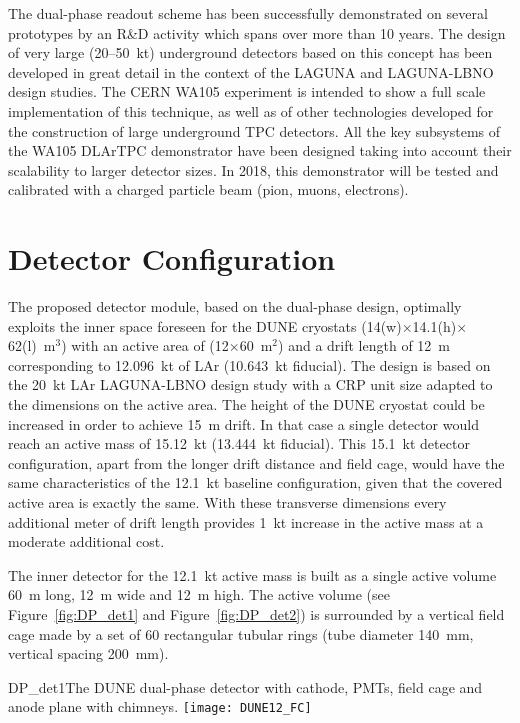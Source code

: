 The dual-phase readout scheme has been successfully demonstrated on
several prototypes by an R\&D activity which spans over more than 10
years.  The design of very large (20--50~kt) underground detectors
based on this concept has been developed in great detail in the
context of the LAGUNA and LAGUNA-LBNO design studies.  The CERN WA105
experiment is intended to show a full scale implementation of this
technique, as well as of other technologies developed for the
construction of large underground TPC detectors.  All the key
subsystems of the WA105 DLArTPC demonstrator have been designed
taking into account their scalability to larger detector sizes.  In
2018, this demonstrator will be tested and calibrated with a charged
particle beam (pion, muons, electrons).


\section{Detector Configuration}

The proposed detector module, based on the dual-phase design,
optimally exploits the inner space foreseen for the DUNE cryostats
(14(w)$\times$14.1(h)$\times$62(l)~m$^3$) with an active area of
(12$\times$60~m$^2$) and a drift length of 12~m corresponding to
12.096~kt of LAr (10.643~kt fiducial). The design is based on the
20~kt LAr LAGUNA-LBNO design study with a
CRP unit size adapted to the dimensions on the active area. The
height of the DUNE cryostat could be increased in order to achieve 15~m
drift. In that case a single detector would reach an active mass of
15.12~kt (13.444~kt fiducial).  This 15.1~kt detector
configuration, apart from the longer drift distance and field cage,
would have the same characteristics of the 12.1~kt baseline
configuration, given that the covered active area is exactly the
same. With these transverse dimensions every additional meter of drift
length provides 1~kt increase in the active mass at a moderate
additional cost.

The inner detector for the 12.1~kt active mass is built as a single
active volume 60~m long, 12~m wide and 12~m high. The active volume (see
Figure~\ref{fig:DP_det1} and Figure~\ref{fig:DP_det2}) is surrounded
by a vertical field cage made by a set of 60 rectangular tubular rings
(tube diameter 140~mm, vertical spacing 200~mm).
\begin{cdrfigure}{DP_det1}{The DUNE dual-phase 
detector with cathode, PMTs, field cage and anode plane with chimneys.}
\texttt{[image: DUNE12\_FC]}
\end{cdrfigure}

